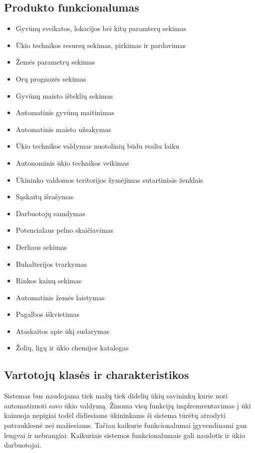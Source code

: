 \documentclass[oneside]{VUMIFPSkursinis}
\begin{document}
\subsection{Produkto funkcionalumas}
\begin{itemize}
	\item Gyvūnų sveikatos, lokacijos bei kitų paramterų sekimas
	\item Ūkio technikos resursų sekimas, pirkimas ir pardavimas
	\item Žemės parametrų sekimas
	\item Orų prognozės sekimas
	\item Gyvūnų maisto išteklių sekimas
	\item Automatinis gyvūnų maitinimas
	\item Automatinis maisto užsakymas
	\item Ūkio technikos valdymas nuotolinių būdu realiu laiku
	\item Autonominis ūkio technikos veikimas
	\item Ūkininko valdomos teritorijos žymėjimas sutartiniais ženklais
	\item Sąskaitų išrašymas
	\item Darbuotojų samdymas
	\item Potencialaus pelno skaičiavimas
	\item Derliaus sekimas
	\item Buhalterijos tvarkymas
	\item Rinkos kainų sekimas
	\item Automatinis žemės laistymas
	\item Pagalbos iškvietimas
	\item Ataskaitos apie ūkį sudarymas
	\item Žolių, ligų ir ūkio chemijos katalogas
\end{itemize}
\subsection{Vartotojų klasės ir charakteristikos}
Sistemas bus naudojama tiek mažų tiek didelių ūkių savininkų kurie nori automatizuoti savo ūkio valdymą. Žinoma visų funkcijų implremrentavimas į ūki kainuoja nepigiai todėl didiesiams ūkininkams ši sistema tūrėtų atrodyti patrauklesnė nei mažiesiams. Tačiau kaikurie funkcionalumai įgyvendinami gan lengvai ir nebrangiai. Kaikuriais sistemos funkcionalumais gali naudotis ir ūkio darbuotojai.
\end{document}
